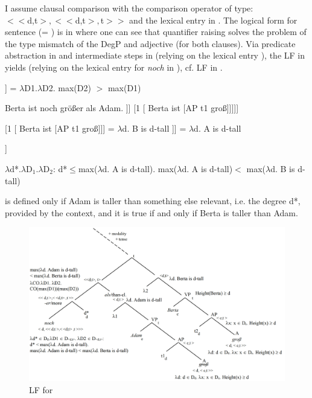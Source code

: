 \documentclass[output=paper,
modfonts
]{langscibook}
\begin{document}
I assume clausal comparison with the comparison operator of type:\\ \mbox{$<<$d,t$>,<<$d,t$>,$t$>>$} \citep[cf.][]{Beck2011} and the lexical entry in . The logical form for sentence  (= ) is in  where one can see that quantifier raising solves the problem of the type mismatch of the DegP and adjective (for both clauses). Via predicate abstraction in  and intermediate steps in (relying on the lexical entry ), the LF in  yields  (relying on the lexical entry for \textit{noch} in ), cf. LF in .

\ea\relax [[-er]] = $\lambda$D1.$\lambda$D2. max(D2) $>$ max(D1) \label{comp-operator}\z

\ea\ea Berta ist noch größer als Adam. \label{B_noch_>_Adam}
\ex [ noch d* [-er than [2[Adam ist [AP t2 groß]]] [1 [ Berta ist [AP t1 groß]]]]] \label{LF_B_noch_>_Adam}
\z\z

\ea\ea \label{PA_on_clauses} [1 [ Berta ist [AP t1 groß]]] = $\lambda$d. B is d-tall
\ex\relax [2 [Adam ist [AP t2 groß]]] =  $\lambda$d. A is d-tall \z\z

\ea\relax [ noch d* [$\lambda$D1.$\lambda$D2. max($\lambda$d. B is d-tall) $>$ max($\lambda$d$'$. A is d$'$-tall) ]] \label{calc_plugin}\z

\ea $\lambda$d*.$\lambda$D$_1$.$\lambda$D$_2$: d*$\leq$max($\lambda$d. A is d-tall). max($\lambda$d. A is d-tall)$<$ max($\lambda$d. B is d-tall)  \label{output_calc}\z

\ea {} is defined only if Adam is taller than something else relevant, i.e. the degree d*, provided by the context, and it is true if and only if Berta is taller than Adam.\z

\begin{figure}
\includegraphics[width=1\textwidth]{figures/LF-mod_comp}
\caption{LF for }
\label{fig:LF_B_noch_>_Adam}
\end{figure}
\end{document}
